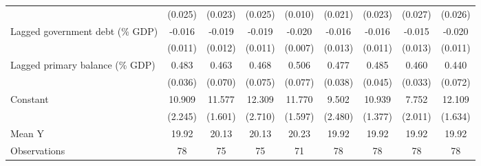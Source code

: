 {\begin{tabular}{l*{8}{c}}
                    &     (0.025)         &     (0.023)         &     (0.025)         &     (0.010)         &     (0.021)         &     (0.023)         &     (0.027)         &     (0.026)         \\
\addlinespace
Lagged government debt (\% GDP)&      -0.016         &      -0.019         &      -0.019         &      -0.020\sym{**} &      -0.016         &      -0.016         &      -0.015         &      -0.020\sym{*}  \\
                    &     (0.011)         &     (0.012)         &     (0.011)         &     (0.007)         &     (0.013)         &     (0.011)         &     (0.013)         &     (0.011)         \\
\addlinespace
Lagged primary balance (\% GDP)&       0.483\sym{***}&       0.463\sym{***}&       0.468\sym{***}&       0.506\sym{***}&       0.477\sym{***}&       0.485\sym{***}&       0.460\sym{***}&       0.440\sym{***}\\
                    &     (0.036)         &     (0.070)         &     (0.075)         &     (0.077)         &     (0.038)         &     (0.045)         &     (0.033)         &     (0.072)         \\
\addlinespace
Constant            &      10.909\sym{***}&      11.577\sym{***}&      12.309\sym{***}&      11.770\sym{***}&       9.502\sym{***}&      10.939\sym{***}&       7.752\sym{***}&      12.109\sym{***}\\
                    &     (2.245)         &     (1.601)         &     (2.710)         &     (1.597)         &     (2.480)         &     (1.377)         &     (2.011)         &     (1.634)         \\
\midrule
Mean Y              &       19.92         &       20.13         &       20.13         &       20.23         &       19.92         &       19.92         &       19.92         &       19.92         \\
Observations        &          78         &          75         &          75         &          71         &          78         &          78         &          78         &          78         \\
\bottomrule
\end{tabular}
}
